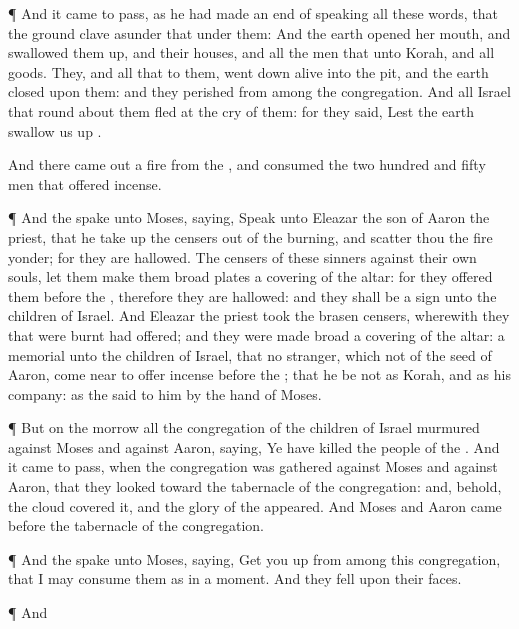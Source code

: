 {\par }{\PP {}¶ And it came to pass, as he had made an
end of
speaking all these
words, that the
ground clave
asunder that
{} under them:
And the
earth
opened her
mouth, and swallowed them
up, and their
houses, and all the
men that
{} unto
Korah, and all
{}
goods.
They, and all that
{} to them, went
down
alive into the
pit, and the
earth
closed upon them: and they
perished from
among the
congregation.
And all
Israel that
{} round
about them
fled at the
cry of them: for they
said, Lest the
earth swallow us
up
{}.
\par }{\PP {}And there came
out a
fire from the
{}, and
consumed the two
hundred and
fifty
men that
offered
incense.
\par }{\PP {}¶ And the
{}
spake unto
Moses,
saying,
Speak unto
Eleazar the
son of
Aaron the
priest, that he take
up the
censers
out of the
burning, and
scatter thou the
fire
yonder; for they are
hallowed.
The
censers of these
sinners against their own
souls, let them
make them
broad
plates
{} a
covering of the
altar: for they
offered them
before the
{}, therefore they are
hallowed: and they shall be a
sign unto the
children of
Israel.
And
Eleazar the
priest
took the
brasen
censers, wherewith they that were
burnt had
offered; and they were made
broad
{} a
covering of the
altar:
 a
memorial unto the
children of
Israel,
that no
stranger, which
{} not of the
seed of
Aaron, come
near to
offer
incense
before the
{}; that he be not as
Korah, and as his
company: as the
{}
said to him by the
hand of
Moses.
\par }{\PP {}¶ But on the
morrow all the
congregation of the
children of
Israel
murmured against
Moses and against
Aaron,
saying, Ye have
killed the
people of the
{}.
And it came to pass, when the
congregation was
gathered against
Moses and against
Aaron, that they
looked toward the
tabernacle of the
congregation: and, behold, the
cloud
covered it, and the
glory of the
{}
appeared.
And
Moses and
Aaron
came
before the
tabernacle of the
congregation.
\par }{\PP {}¶ And the
{}
spake unto
Moses,
saying,
Get you
up from
among this
congregation, that I may
consume them as in a
moment. And they
fell upon their
faces.
\par }{\PP {}¶ And
}

